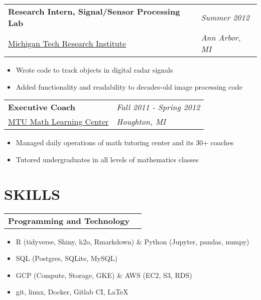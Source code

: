 \documentclass[margin,line]{res}
\begin{document}
\begin{resume}
\begin{tabular}{p{4.4in} l} %
  {\bf Research Intern, Signal/Sensor Processing Lab } &  \emph{Summer 2012}\\
  \href{http://www.mtri.org/}{Michigan Tech Research Institute} & \emph{Ann Arbor, MI}
\end{tabular}
\vspace{2pt}
\begin{itemize}\itemsep -2pt %
  \item Wrote code to track objects in digital radar signals
  \item Added functionality and readability to decades-old image processing code
\end{itemize}

\begin{tabular}{p{4.4in} l}
  {\bf Executive Coach} &  \emph{Fall 2011 - Spring 2012}\\
  \href{https://www.mtu.edu/math/undergraduate/learning-center/}{MTU Math Learning Center} & \emph{Houghton, MI}
\end{tabular}
\vspace{1pt}
\begin{itemize}\itemsep -2pt %
  \item Managed daily operations of math tutoring center and its 30+ coaches
  \item Tutored undergraduates in all levels of mathematics classes
\end{itemize}

\vspace{3pt}


\section{SKILLS}

\begin{tabular}{p{4.4in} l}
  {\bf Programming and Technology}
\end{tabular}
\vspace{2pt}
\begin{itemize} \itemsep -2pt
  \item R (tidyverse, Shiny, h2o, Rmarkdown) \& Python (Jupyter, pandas, numpy)
  \item SQL (Postgres, SQLite, MySQL)
  \item GCP (Compute, Storage, GKE) \& AWS (EC2, S3, RDS)
  \item git, linux, Docker, Gitlab CI, \LaTeX
\end{itemize}


\end{resume}
\end{document}
